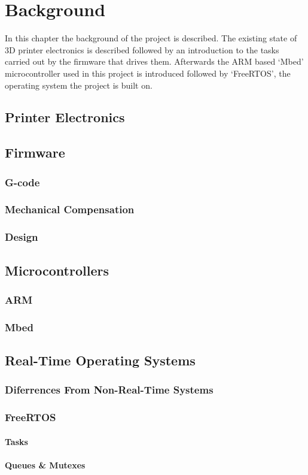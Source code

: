 \chapter{Background}
	
	\label{sec:background}
	
	In this chapter the background of the project is described. The existing state
	of 3D printer electronics is described followed by an introduction to the
	tasks carried out by the firmware that drives them. Afterwards the ARM based
	`Mbed' microcontroller used in this project is introduced followed by
	`FreeRTOS', the operating system the project is built on.
	
	\section{Printer Electronics}
		
	\section{Firmware}
		
		\subsection{G-code}
		
		\subsection{Mechanical Compensation}
		
		\subsection{Design}
	
	\section{Microcontrollers}
		
		\subsection{ARM}
		
		\subsection{Mbed}
	
	\section{Real-Time Operating Systems}
		
		\subsection{Diferrences From Non-Real-Time Systems}
		
		\subsection{FreeRTOS}
		
			\subsubsection{Tasks}
			
			\subsubsection{Queues \& Mutexes}
